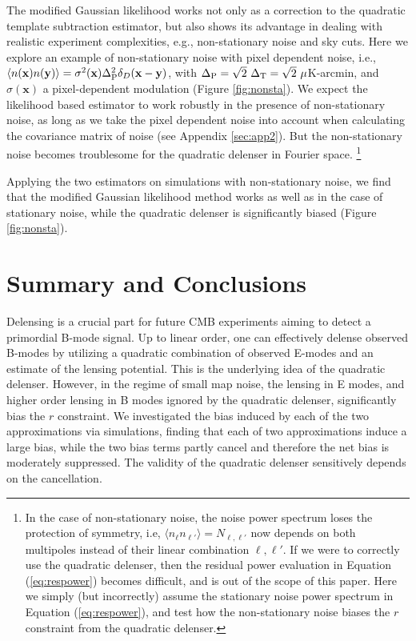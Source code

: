 \documentclass[iop,apj, numberedappendix]{emulateapj}
\newcommand*\Bell{\ensuremath{\boldsymbol\ell}}
\begin{document}
The modified Gaussian likelihood  works not only as a correction to
the quadratic template subtraction estimator,
but also shows its advantage in dealing with realistic experiment complexities,
e.g., non-stationary noise and sky cuts.
Here we explore an example of non-stationary noise with pixel
dependent noise, i.e., $\left< n(\mathbf x) n(\mathbf y)\right>
= \sigma^2(\mathbf x)\Delta_{\rm P}^2 \delta_D(\mathbf x-\mathbf y)$,
with $\Delta_{\rm P}=\sqrt{2} \ \Delta_{\rm T} = \sqrt{2}\ \mu$K-arcmin, and
$\sigma(\mathbf x)$  a pixel-dependent modulation (Figure \ref{fig:nonsta}).
We expect the likelihood based estimator to work robustly in the presence of non-stationary noise,
as long as we take the pixel dependent noise into account
when calculating the covariance matrix of noise (see Appendix \ref{sec:app2}).
But the non-stationary noise becomes troublesome for
the quadratic delenser in  Fourier space.
\footnote{In the case of non-stationary noise,
the noise power spectrum loses the protection of symmetry,
i.e, $\langle n_{\Bell}n_{\Bell'}\rangle = N_{\Bell,\Bell'}$ now depends on
both multipoles instead of their linear combination $\Bell,\Bell'$.
If we were to correctly use the quadratic delenser,
then the residual power evaluation in Equation (\ref{eq:respower})
becomes difficult, and is out of the scope of this paper.
Here we simply (but incorrectly) assume the stationary noise power spectrum in Equation (\ref{eq:respower}),
and test how the non-stationary noise biases the $r$ constraint from the quadratic delenser.}

Applying the two estimators on simulations with non-stationary noise,
we find that the modified Gaussian likelihood method works as well as in the case of stationary noise,
while the quadratic delenser is significantly biased (Figure \ref{fig:nonsta}).

\section{Summary and Conclusions}
\label{sec:summary}

Delensing is a crucial part for future CMB experiments aiming to detect a primordial B-mode signal.
Up to linear order, one can effectively delense observed B-modes by utilizing
a quadratic combination of observed E-modes and an estimate of the lensing potential.
This is the underlying idea of the quadratic delenser.
However, in the regime of small map noise,
the lensing in E modes, and higher order lensing in B modes
ignored by the quadratic delenser, significantly bias the $r$ constraint.
We investigated the bias induced by each of the two approximations via simulations,
finding that each of two approximations induce a large bias, while the two bias terms
partly cancel and therefore the net bias is moderately suppressed.
The validity of the quadratic delenser sensitively depends on the cancellation.
\end{document}
